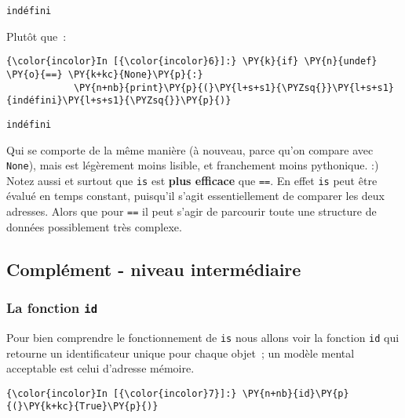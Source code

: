     \begin{Verbatim}[commandchars=\\\{\}]
indéfini

    \end{Verbatim}

    Plutôt que~:

    \begin{Verbatim}[commandchars=\\\{\}]
{\color{incolor}In [{\color{incolor}6}]:} \PY{k}{if} \PY{n}{undef} \PY{o}{==} \PY{k+kc}{None}\PY{p}{:}
            \PY{n+nb}{print}\PY{p}{(}\PY{l+s+s1}{\PYZsq{}}\PY{l+s+s1}{indéfini}\PY{l+s+s1}{\PYZsq{}}\PY{p}{)}
\end{Verbatim}


    \begin{Verbatim}[commandchars=\\\{\}]
indéfini

    \end{Verbatim}

    Qui se comporte de la même manière (à nouveau, parce qu'on compare avec
\texttt{None}), mais est légèrement moins lisible, et franchement moins
pythonique. :)\\

    Notez aussi et surtout que \texttt{is} est \textbf{plus efficace} que
\texttt{==}. En effet \texttt{is} peut être évalué en temps constant,
puisqu'il s'agit essentiellement de comparer les deux adresses. Alors
que pour \texttt{==} il peut s'agir de parcourir toute une structure de
données possiblement très complexe.

    \hypertarget{compluxe9ment---niveau-intermuxe9diaire}{%
\subsection{Complément - niveau
intermédiaire}\label{compluxe9ment---niveau-intermuxe9diaire}}

    \hypertarget{la-fonction-id}{%
\subsubsection{\texorpdfstring{La fonction
\texttt{id}}{La fonction id}}\label{la-fonction-id}}

    Pour bien comprendre le fonctionnement de \texttt{is} nous allons voir
la fonction \texttt{id} qui retourne un identificateur unique pour
chaque objet~; un modèle mental acceptable est celui d'adresse mémoire.

    \begin{Verbatim}[commandchars=\\\{\}]
{\color{incolor}In [{\color{incolor}7}]:} \PY{n+nb}{id}\PY{p}{(}\PY{k+kc}{True}\PY{p}{)}
\end{Verbatim}



